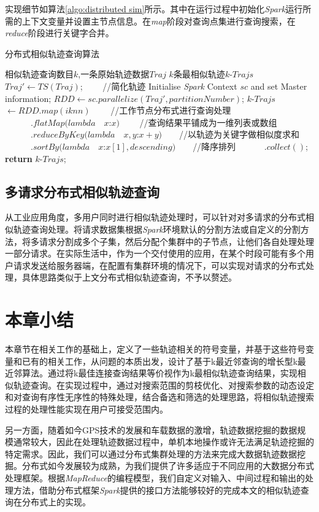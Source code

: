 实现细节如算法\ref{algo:distributed sim}所示。其中在运行过程中初始化\emph{Spark}运行所需的上下文变量并设置主节点信息。在\emph{map}阶段对查询点集进行查询搜索，在\emph{reduce}阶段进行关键字合并。

\begin{algorithm}
\caption{分布式相似轨迹查询算法}
\label{algo:distributed sim}
\begin{algorithmic}[1] %
\Require 相似轨迹查询数目$k$,一条原始轨迹数据$Traj$%
\Ensure $k$条最相似轨迹$k$-$Trajs$ %
\State $Traj' \gets TS(Traj)$; $\qquad$//简化轨迹
\State Initialise \emph{Spark} Context $sc$ and set Master information;
\State $RDD \gets sc.parallelize(Traj', partitionNumber)$;
\State $k$-$Trajs$ $\gets RDD.map(iknn) $ $\qquad$//工作节点分布式进行查询处理
\State $\qquad\quad.flatMap(lambda\quad x$:$x)$ $\qquad$//查询结果平铺成为一维列表或数组
\State $\qquad\quad.reduceByKey(lambda\quad x,y$:$x+y)$$\qquad$//以轨迹为关键字做相似度求和
\State $\quad\qquad.sortBy(lambda\quad x$:$x[1], descending)$$\qquad$//降序排列
\State $\quad\qquad.collect()$;
\State \textbf{return} $k$-$Trajs$; 
\end{algorithmic}
\end{algorithm}

\subsection{多请求分布式相似轨迹查询}
\label{subsec:distributed multiple}
从工业应用角度，多用户同时进行相似轨迹处理时，可以针对对多请求的分布式相似轨迹查询处理。将请求数据集根据\emph{Spark}环境默认的分割方法或自定义的分割方法，将多请求分割成多个子集，然后分配个集群中的子节点，让他们各自处理处理一部分请求。在实际生活中，作为一个交付使用的应用，在某个时段可能有多个用户请求发送给服务器端，在配置有集群环境的情况下，可以实现对请求的分布式处理，具体思路类似于上文分布式相似轨迹查询，不予以赘述。

\section{本章小结}
\label{sec:implementation conclusion}
本章节在相关工作的基础上，定义了一些轨迹相关的符号变量，并基于这些符号变量和已有的相关工作，从问题的本质出发，设计了基于k最近邻查询的增长型k最近邻算法。通过将k最佳连接查询结果等价视作为k最相似轨迹查询结果，实现相似轨迹查询。在实现过程中，通过对搜索范围的剪枝优化、对搜索参数的动态设定和对查询有序性无序性的特殊处理，结合备选和筛选的处理思路，将相似轨迹搜索过程的处理性能实现在用户可接受范围内。

另一方面，随着如今GPS技术的发展和车载数据的激增，轨迹数据挖掘的数据规模通常较大，因此在处理轨迹数据过程中，单机本地操作或许无法满足轨迹挖掘的特定需求。因此，我们可以通过分布式集群处理的方法来完成大数据轨迹数据挖掘。分布式如今发展较为成熟，为我们提供了许多适应于不同应用的大数据分布式处理框架。根据\emph{MapReduce}的编程模型，我们自定义对输入、中间过程和输出的处理方法，借助分布式框架\emph{Spark}提供的接口方法能够较好的完成本文的相似轨迹查询在分布式上的实现。